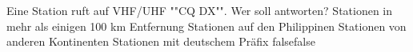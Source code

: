     {Eine Station ruft auf VHF/UHF ""CQ DX"". Wer soll antworten?}
    {Stationen in mehr als einigen 100 km Entfernung}
    {Stationen auf den Philippinen}
    {Stationen von anderen Kontinenten}
    {Stationen mit deutschem Präfix}
    {false}{false}